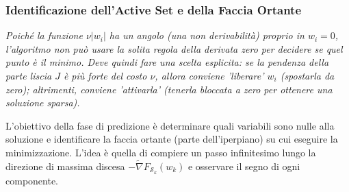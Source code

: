 \documentclass[a4paper,12pt]{article}
\numberwithin{equation}{section}
\numberwithin{figure}{section}
\numberwithin{table}{section}
\begin{document}
\subsubsection{Identificazione dell'Active Set e della Faccia Ortante}
\textit{Poiché la funzione \(\nu|w_i|\) ha un angolo (una non derivabilità) proprio in \(w_i = 0\), l'algoritmo non può usare la solita regola della derivata zero per decidere se quel punto è il minimo. Deve quindi fare una scelta esplicita: se la pendenza della parte liscia \(J\) è più forte del costo \(\nu\), allora conviene 'liberare' \(w_i\) (spostarla da zero); altrimenti, conviene 'attivarla' (tenerla bloccata a zero per ottenere una soluzione sparsa).}

L'obiettivo della fase di predizione è determinare quali variabili sono nulle
alla soluzione e identificare la faccia ortante (parte dell'iperpiano) su cui eseguire la
minimizzazione. L'idea è quella di compiere un passo infinitesimo lungo la
direzione di massima discesa $-\widetilde{\nabla}F_{\mathcal{S}_k}(w_k)$ e
osservare il segno di ogni componente.
\end{document}
